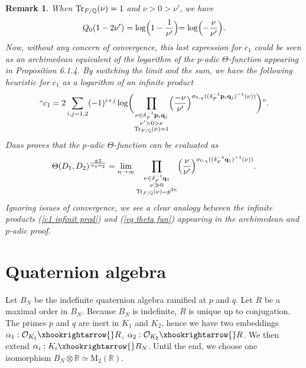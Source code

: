 \documentclass[a4paper,12pt]{article}
\newtheorem{remark}[theorem]{Remark}
\begin{document}
\begin{remark} When $\textup{Tr}_{F/\mathbb{Q}}(\nu)=1$ and $\nu>0>\nu'$, we have
    \[Q_0(1-2\nu')=\log\Bigl(1-\frac{1}{\nu'}\Bigl)=\log\Bigl(-\frac{\nu}{\nu'}\Bigl).\] Now, without any concern of convergence, this last expression for $c_1$ could be seen as an archimedean equivalent of the logarithm of the $p$-adic $\Theta$-function appearing in \cite{Daas} Proposition 6.1.4. 
   By switching the limit and the sum, we have the following heuristic for $c_1$ as a logarithm of an infinite product
    \begin{equation}\label{c1 infinit prod}
        \text{``}c_1=2\sum_{i,j=1,2}(-1)^{i+j}\log\biggl(\prod_{\substack{\nu\in \delta_F^{-1}\mathbf{p}_i\mathbf{q}_j\\ \nu'>0>\nu\\ \textup{Tr}_{F/\mathbb{Q}}(\nu)=1}}\Bigl(\frac{-\nu}{\nu'}\Bigl)^{\sigma_{0,\chi}((\delta_F^{-1}\mathbf{p}_i\mathbf{q}_j)^{-1}(\nu))}\biggl)\text{''}.
    \end{equation}
   Daas proves that the $p$-adic $\Theta$-function can be evaluated as
    \begin{equation}\label{eq theta fun}
        \Theta(D_1,D_2)^{\frac{\pm2}{w_1w_2}}=\lim_{n\rightarrow\infty}\prod_{\substack{\nu\in \delta_F^{-1}\mathbf{q}_1\\\nu\gg0\\ \textup{Tr}_{F/\mathbb{Q}}(\nu)=p^{2n}}}\Bigl(\frac{\nu}{\nu'}\Bigl)^{\sigma_{0,\chi}((\delta_F^{-1}\mathbf{q}_1)^{-1}(\nu))}.
    \end{equation}
Ignoring issues of convergence, we see a clear analogy between the infinite products (\ref{c1 infinit prod}) and (\ref{eq theta fun}) appearing in the archimedean and $p$-adic proof.
\end{remark}
\section{Quaternion algebra}\label{section Quaternion}
Let $B_{N}$ be the indefinite quaternion algebra ramified at $p$ and $q$. Let $R$ be a maximal order in $B_{N}$. Because $B_{N}$ is indefinite, $R$ is unique up to conjugation. The primes $p$ and $q$ are inert in $K_1$ and $K_2$, hence we have two embeddings $\alpha_1 : \mathcal{O}_{K_1}\xhookrightarrow{}R$, $\alpha_2:\mathcal{O}_{K_2}\xhookrightarrow{}R$. We then extend $\alpha_i:K_i\xhookrightarrow{}B_{N}$. Until the end, we choose one isomorphism $B_{N}\otimes\mathbb{R}\simeq \text{M}_2(\mathbb{R})$.
\end{document}
